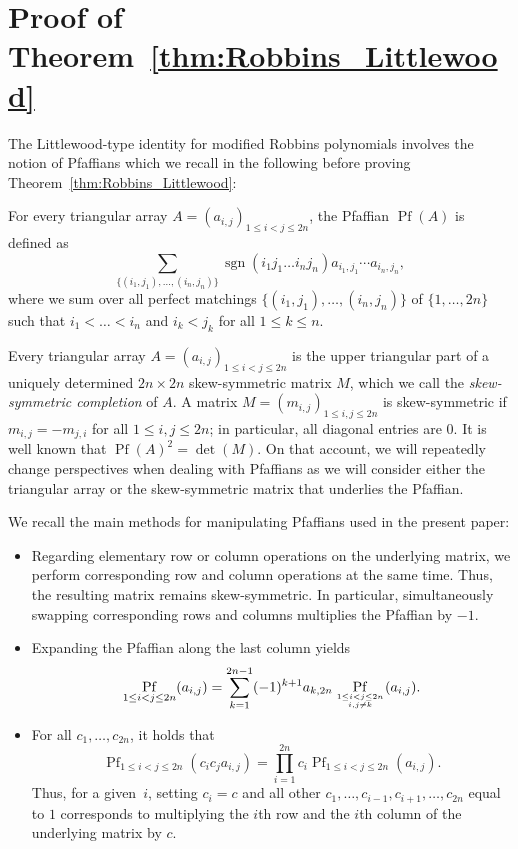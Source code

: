 \documentclass[10pt,a4paper]{article}
\theoremstyle{definition}
\newcommand\myatop[2]{\genfrac{}{}{0pt}{}{#1}{#2}}
\DeclareMathOperator{\sgn}{sgn}
\DeclareMathOperator*{\pf}{Pf}
\begin{document}
\setcounter{section}{3}
\section{Proof of Theorem~\ref{thm:Robbins_Littlewood}}
\label{sec:mainproof}
\setcounter{equation}{5}

	The Littlewood-type identity for modified Robbins polynomials  involves the notion of Pfaffians which we recall in the following before proving Theorem~\ref{thm:Robbins_Littlewood}:
	
	For every triangular array $A=(a_{i,j})_{1 \le i < j \le 2n}$, the Pfaffian $\pf(A)$ is defined as
	\begin{equation*}
		\sum_{\{(i_1,j_1),\dots,(i_n,j_n)\}} \sgn(i_1 j_1 \dots i_n j_n) a_{i_1,j_1} \cdots a_{i_n,j_n},
	\end{equation*}
	where we sum over all perfect matchings $\{(i_1,j_1),\dots,(i_n,j_n)\}$ of $\{1,\dots,2n\}$ such that $i_1 < \dots < i_n$ and $i_k < j_k$ for all $1 \le k \le n$.
	
	Every triangular array $A=(a_{i,j})_{1 \le i < j \le 2n}$ is the upper triangular part of a uniquely determined $2n \times 2n$ skew-symmetric matrix $M$, which we call the \emph{skew-symmetric completion} of $A$. A matrix $M=(m_{i,j})_{1 \le i , j \le 2n}$ is skew-symmetric if $m_{i,j} = - m_{j,i}$ for all $1 \le i,j \le 2n$; in particular, all diagonal entries are $0$. It is well known that $\pf(A)^2=\det(M)$. On that account, we will repeatedly change perspectives when dealing with Pfaffians as we will consider either the triangular array or the skew-symmetric matrix that underlies the Pfaffian.
	
	We recall the main methods for manipulating Pfaffians used in the present paper:
	\begin{itemize}
		\item Regarding elementary row or column operations on the underlying  matrix, we perform corresponding row and column operations at the same time. Thus, the resulting matrix remains skew-symmetric. In particular, simultaneously swapping corresponding rows and columns multiplies the Pfaffian by $-1$.
		\item Expanding the Pfaffian along the last column yields
		\begin{equation*}
			\pf_{1 \le i < j \le 2n} (a_{i,j}) = \sum_{k=1}^{2n-1} (-1)^{k+1} a_{k,2n} \pf_{\myatop{1 \le i < j \le 2n}{i,j \neq k}} (a_{i,j}).
		\end{equation*}
		\item For all $c_1,\dots,c_{2n}$, it holds that
		\begin{equation}\label{eq:linearity_pfaffian}
			\pf_{1 \le i < j \le 2n} (c_i c_j a_{i,j}) = \prod_{i=1}^{2n} c_i \pf_{1 \le i < j \le 2n} (a_{i,j}).
		\end{equation}
		Thus, for a given~$i$, setting $c_i=c$ and all other $c_1,\dots,c_{i-1},c_{i+1},\dots,c_{2n}$ equal to $1$ corresponds to multiplying the $i$th row and the $i$th column of the underlying matrix by $c$.
	\end{itemize}
	
\end{document}
